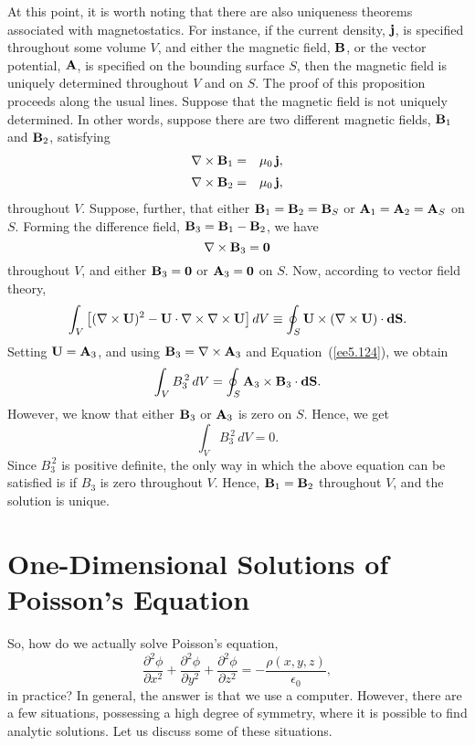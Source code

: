 At this point, it is worth noting  that there are also uniqueness theorems associated with
magnetostatics. For instance, if the current density, ${\bf j}$, is specified
throughout some volume $V$, and either the magnetic field, ${\bf B}$,
or the vector potential, ${\bf A}$, is specified on the bounding surface $S$, then
the magnetic field is uniquely determined throughout $V$ and on $S$.
The proof of this proposition proceeds along the usual lines. Suppose
that the magnetic field is not uniquely determined. In other words,
suppose there are two different magnetic fields, ${\bf B}_1$ and ${\bf B}_2$, 
satisfying
\begin{eqnarray}
\nabla\times{\bf B}_1 &=&\mu_0\,{\bf j},\\[0.5ex]
\nabla\times{\bf B}_2 &=&\mu_0\,{\bf j},
\end{eqnarray}
throughout $V$. Suppose, further, that either ${\bf B}_1={\bf B}_2={\bf B}_S$ or ${\bf A}_1={\bf A}_2={\bf A}_S$ on $S$. Forming the
difference field, ${\bf B}_3={\bf B}_1-{\bf B}_2$, we
have
\begin{equation}\label{ee5.124}
\nabla\times{\bf B}_3={\bf 0}
\end{equation}
throughout $V$, and either ${\bf  B}_3={\bf 0}$ or ${\bf A}_3={\bf 0}$
on $S$.
Now, according to vector field theory,
\begin{equation}
\int_V\left[(\nabla\times{\bf U})^2 - {\bf U}\cdot\nabla\times\nabla\times{\bf U}\right]dV \equiv \oint_S {\bf U}\times(\nabla\times{\bf U})\cdot {\bf dS}.
\end{equation}
Setting ${\bf U}={\bf A}_3$, and using  ${\bf B}_3=\nabla\times{\bf A}_3$ and Equation~(\ref{ee5.124}), we obtain
\begin{equation}
\int_V B_3^{\,2}\,dV = \oint_S {\bf A}_3\times{\bf B}_3\cdot{\bf dS}.
\end{equation}
However, we know that either ${\bf B}_3$ or ${\bf A}_3$ is zero on $S$.
Hence, we get
\begin{equation}
\int_V B_3^{\,2}\,dV = 0.
\end{equation}
Since $B_3^{\,2}$ is positive definite, the only way in which the above
equation can be satisfied is if $B_3$ is zero throughout $V$. Hence,
${\bf B}_1={\bf B}_2$ throughout $V$, and the solution is  unique.

\section{One-Dimensional Solutions of Poisson's Equation}
So, how do we actually solve Poisson's equation, 
\begin{equation}
\frac{\partial^2\phi}{\partial x^2} +\frac{\partial^2\phi}{\partial y^2} +
\frac{\partial^2\phi}{\partial z^2} = -\frac{\rho(x,y,z)}{\epsilon_0},
\end{equation}
in practice? In general, the answer is that we use a computer. However, there
are a few situations, possessing a high degree of symmetry, where it is possible
to find analytic solutions. Let us discuss some of these situations. 

